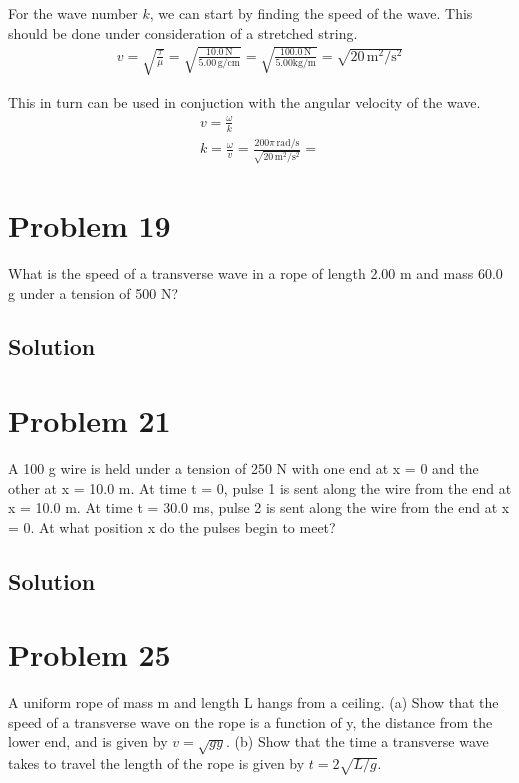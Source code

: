 \documentclass[12pt]{article}
\begin{document}
            For the wave number $k$, we can start by finding the speed of the wave.
            This should be done under consideration of a stretched string.
            \begin{gather}
                v   =   \sqrt{\frac{\tau}{\mu}}
                    =   \sqrt{\frac{10.0\,\unit{\newton}}{5.00\,\unit{\gram/\centi\meter}}}
                    =   \sqrt{\frac{100.0\,\unit{\newton}}{5.00\unit{\kilo\gram/\meter}}}
                    =   \sqrt{20\,\unit{\meter^2/\second^2}}
            \end{gather}

            This in turn can be used in conjuction with the angular velocity of the wave. 
            \begin{gather}
                v   =   \frac{\omega}{k}\\
                k   =   \frac{\omega}{v}
                    =   \frac{200\pi\,\unit{\radian/\second}}{\sqrt{20\,\unit{\meter^2/\second^2}}}
                    =   
            \end{gather}

    \section{Problem 19}
        What is the speed of a transverse wave in a rope of length 2.00 m and mass 60.0 g under a tension of 500 N?

        \subsection{Solution}

    \section{Problem 21}
        A 100 g wire is held under a tension of 250 N with one end at x = 0 and the other at x = 10.0 m. 
        At time t = 0, pulse 1 is sent along the wire from the end at x = 10.0 m. 
        At time t = 30.0 ms, pulse 2 is sent along the wire from the end at x = 0. 
        At what position x do the pulses begin to meet?

        \subsection{Solution}

    \section{Problem 25}
        A uniform rope of mass m and length L hangs from a ceiling. 
        (a) Show that the speed of a transverse wave on the rope is a function of y, the distance from the lower end, and is given by $v = \sqrt{gy}$.
        (b) Show that the time a transverse wave takes to travel the length of the rope is given by $t = 2\sqrt{L/g}$.
\end{document}
